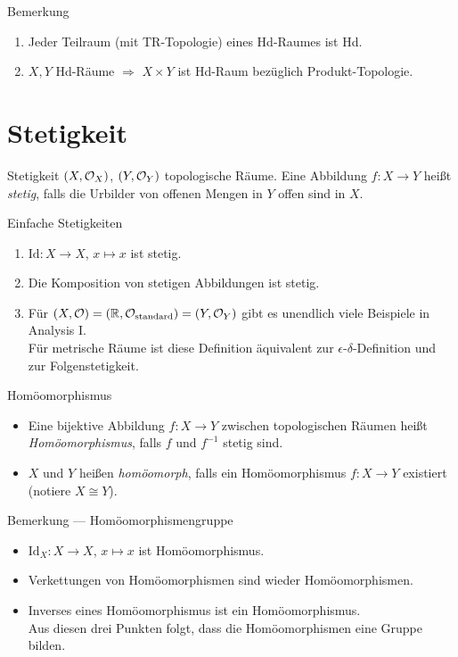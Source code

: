 \begin{bla}{Bemerkung}
  \begin{enumerate}
    \item Jeder Teilraum (mit TR-Topologie) eines Hd-Raumes ist Hd. 
    \item $ X, Y $ Hd-Räume $ \Rightarrow $ $ X \times Y $ ist Hd-Raum bezüglich Produkt-Topologie.
  \end{enumerate}
\end{bla}

\section{Stetigkeit}

\begin{definition}{Stetigkeit}
  $ (X, \mathcal{O}_X) $, $ (Y, \mathcal{O}_Y) $ topologische Räume. Eine Abbildung $ f : X \to Y $ heißt \emph{stetig}, falls die Urbilder von offenen Mengen in $ Y $ offen sind in $ X $.
\end{definition}

\begin{example}{Einfache Stetigkeiten}
  \begin{enumerate}
    \item $ \text{Id}: X \to X $, $ x \mapsto x $ ist stetig.
    \item Die Komposition von stetigen Abbildungen ist stetig.
    \item Für $ (X, \mathcal{O}) = (\mathbb{R}, \mathcal{O}_\text{standard}) = (Y, \mathcal{O}_Y) $ gibt es unendlich viele Beispiele in Analysis I. \\
    Für metrische Räume ist diese  Definition äquivalent zur $ \epsilon $-$ \delta $-Definition und zur Folgenstetigkeit.
  \end{enumerate}
\end{example}

\begin{definition}{Homöomorphismus}
  \begin{itemize}
    \item Eine bijektive Abbildung $ f: X \to Y $ zwischen topologischen Räumen heißt \emph{Homöomorphismus}, falls $ f $ und $ f^{-1} $ stetig sind.
    \item $ X $ und $ Y $ heißen \emph{homöomorph}, falls ein Homöomorphismus $ f: X \to Y $ existiert (notiere $ X \cong Y $). 
  \end{itemize}
\end{definition}

\begin{bla}{Bemerkung --- Homöomorphismengruppe}
  \begin{itemize}
    \item $ \text{Id}_X: X \to X $, $ x \mapsto x $ ist Homöomorphismus.
    \item Verkettungen von Homöomorphismen sind wieder Homöomorphismen.
    \item Inverses eines Homöomorphismus ist ein Homöomorphismus. \\
      Aus diesen drei Punkten folgt, dass die Homöomorphismen eine Gruppe bilden.
  \end{itemize}
\end{bla}

